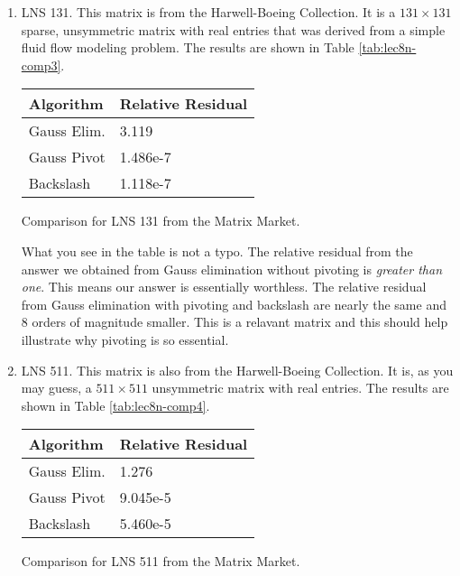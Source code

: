 \begin{enumerate}
\item LNS 131.  This matrix is from the Harwell-Boeing Collection.  It is a $131 \times 131$ sparse, unsymmetric matrix with real entries that was derived from a simple fluid flow modeling problem. The results are shown in Table \ref{tab:lec8n-comp3}.  %
\begin{margintable}
\begin{tabular}{|l | l |}
\hline
\textbf{Algorithm} & \textbf{Relative Residual} \\ \hline
Gauss Elim. & 3.119 \\ \hline
Gauss Pivot & 1.486e-7 \\ \hline
Backslash & 1.118e-7 \\ \hline
\end{tabular}
\caption{Comparison for LNS 131 from the Matrix Market.}
\label{tab:lec8n-comp3}
\end{margintable}
What you see in the table is not a typo.  The relative residual from the answer we obtained from Gauss elimination without pivoting is \emph{greater than one}.  This means our answer is essentially worthless.  The relative residual from Gauss elimination with pivoting and backslash are nearly the same and 8 orders of magnitude smaller.  This is a relavant matrix and this should help illustrate why pivoting is so essential.  

\item LNS 511.  This matrix is also from the Harwell-Boeing Collection.  It is, as you may guess, a $511 \times 511$ unsymmetric matrix with real entries.  The results are shown in Table \ref{tab:lec8n-comp4}.
\begin{margintable}
\begin{tabular}{|l | l |}
\hline
\textbf{Algorithm} & \textbf{Relative Residual} \\ \hline
Gauss Elim. & 1.276 \\ \hline
Gauss Pivot & 9.045e-5 \\ \hline
Backslash & 5.460e-5 \\ \hline
\end{tabular}
\caption{Comparison for LNS 511 from the Matrix Market.}
\label{tab:lec8n-comp4}
\end{margintable}
\end{enumerate}

